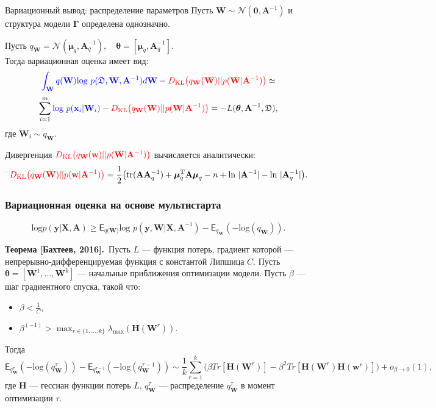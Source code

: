 \documentclass[usenames,dvipsnames,11pt,pdf,utf8,russian,aspectratio=169]{beamer}
\begin{document}
\begin{frame}{Вариационный вывод: распределение параметров}
Пусть $\mathbf{W} \sim \mathcal{N}(\mathbf{0}, \mathbf{A}^{-1})$ и структура модели $\boldsymbol{\Gamma}$ определена однозначно.

Пусть $q_\mathbf{W} = \mathcal{N}(\boldsymbol{\mu}_q, \mathbf{A}^{-1}_q), \quad \boldsymbol{\theta} =  [\boldsymbol{\mu}_q, \mathbf{A}^{-1}_q].$ \\
Тогда вариационная оценка имеет вид:
$$
\textcolor{blue}{\int_{\mathbf{W}} q(\mathbf{W})\text{log}~{p(\mathfrak{D},\mathbf{W},\mathbf{A}^{-1})} d \mathbf{W}} - \textcolor{red}{D_\text{KL}\bigl(q_\mathbf{W} (\mathbf{W} )|| p (\mathbf{W}|\mathbf{A}^{-1})\bigr)} \simeq
$$
$$
\sum_{i=1}^m \textcolor{blue}{\text{log}~p(\mathbf{x}_i | \mathbf{W}_i)} - \textcolor{red}{D_\text{KL}\bigl(q_\mathbf{W} (\mathbf{W} )|| p (\mathbf{W}|\mathbf{A}^{-1})\bigr)} = -L(\boldsymbol{\theta}, \mathbf{A}^{-1}, \mathfrak{D}),
$$
где $\mathbf{W}_i \sim q_\mathbf{W}$.

Дивергенция $\textcolor{red}{D_\text{KL}\bigl(q_\mathbf{W} (\mathbf{w} )|| p (\mathbf{W}|\mathbf{A}^{-1})\bigr)}$ вычисляется аналитически:
$$
\textcolor{red}{D_\text{KL}\bigl(q_\mathbf{W} (\mathbf{W}) || p (\mathbf{w}|\mathbf{A}^{-1})\bigr)} = \frac{1}{2} \bigl( \text{tr} (\mathbf{A}\mathbf{A}^{-1}_q) + \boldsymbol{\mu}_q^\text{T}\mathbf{A}\boldsymbol{\mu}_q - n +\text{ln}~|\mathbf{A}^{-1}| - \text{ln}~|\mathbf{A}^{-1}_q| \bigr).
$$

\end{frame}

\begin{frame}
\frametitle{Вариационная оценка на основе мультистарта}
$$\text{log}p(\mathbf{y}|\mathbf{X}, \mathbf{A}) \geq \mathsf{E}_{q(\mathbf{W)}}\text{log~}p (\mathbf{y}, \mathbf{W}|\mathbf{X}, \mathbf{A}^{-1}) - \mathsf{E}_{q_{\mathbf{W}}}(-\text{log}(q_\mathbf{W})).$$

\textbf{Теорема [Бахтеев, 2016].}~Пусть $L$ --- функция потерь, градиент которой ---  непрерывно-дифференцируемая функция с константой Липшица $C$. Пусть $\boldsymbol{\theta} = [\mathbf{W}^1,\dots,\mathbf{W}^k]$ ---  начальные приближения оптимизации модели. Пусть $\beta$ --- шаг градиентного спуска, такой что:
\begin{itemize}
\item $\beta<\frac{1}{C}$,
\item $\beta^{(-1)} > \max_{r \in \{1,\dots,k\}}\lambda_\text{max} (\mathbf{H}(\mathbf{W}^r))$.
\end{itemize}
Тогда
\small
\[
	\mathsf{E}_{q^{\tau}_{\mathbf{W}}}(-\text{log}(q^{\tau}_\mathbf{W})) -  \mathsf{E}_{q^{\tau-1}_{\mathbf{W}}}(-\text{log}(q^{\tau-1}_\mathbf{W}))  \sim  \frac{1}{k}\sum_{r=1}^k \bigl(\beta Tr[\mathbf{H}(\mathbf{W}^r)] - \beta^2 Tr[\mathbf{H}(\mathbf{W}^r)\mathbf{H}(\mathbf{w}^r)]  \bigr) + o_{\beta \to 0}(1),
\]
где $\mathbf{H}$ --- гессиан функции потерь $L$, $q^{\tau}_\mathbf{W}$ --- распределение $q^{\tau}_\mathbf{W}$ в момент оптимизации $\tau$.
\end{frame}
\end{document}
